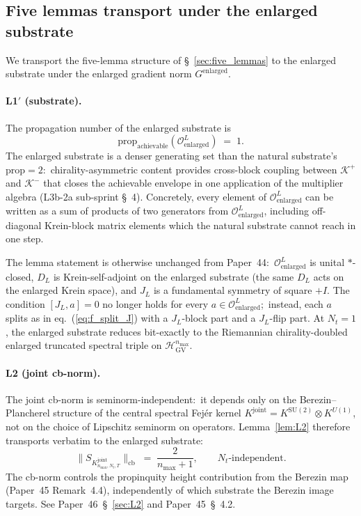 \documentclass[11pt,a4paper]{article}
\theoremstyle{plain}
\theoremstyle{definition}
\newcommand{\nmax}{n_{\max}}
\newcommand{\Nt}{N_{t}}
\newcommand{\Krein}{\mathcal{K}}
\newcommand{\Op}{\mathcal{O}}
\newcommand{\cbnorm}[1]{\lVert #1 \rVert_{\mathrm{cb}}}
\newcommand{\SU}{\mathrm{SU}}
\newcommand{\Uone}{U(1)}
\newcommand{\DL}{D_{L}}
\newcommand{\JL}{J_{L}}
\newcommand{\Kjoint}{K^{\mathrm{joint}}}
\newcommand{\KSU}{K^{\SU(2)}}
\newcommand{\KU}{K^{\Uone}}
\newcommand{\HGV}{\mathcal{H}_{\mathrm{GV}}}
\newcommand{\Kplus}{\Krein^{+}}
\newcommand{\Kminus}{\Krein^{-}}
\newcommand{\prop}{\mathrm{prop}}
\begin{document}
\subsection{Five lemmas transport under the enlarged substrate}
\label{app:enlarged_transport}

We transport the five-lemma structure of \S~\ref{sec:five_lemmas} to
the enlarged substrate under the enlarged gradient norm
$G^{\mathrm{enlarged}}$.

\paragraph{L1$'$ (substrate).}
The propagation number of the enlarged substrate is
\begin{equation}\label{eq:prop_enlarged}
   \prop_{\mathrm{achievable}}(\Op^{L}_{\mathrm{enlarged}}) \;=\; 1.
\end{equation}
The enlarged substrate is a denser generating set than the natural
substrate's $\prop = 2$:\ chirality-asymmetric content provides
cross-block coupling between $\Kplus$ and $\Kminus$ that closes the
achievable envelope in one application of the multiplier algebra
(L3b-2a sub-sprint \S~4). Concretely, every element of $\Op^{L}_{\mathrm{enlarged}}$
can be written as a sum of products of two generators from
$\Op^{L}_{\mathrm{enlarged}}$, including off-diagonal Krein-block
matrix elements which the natural substrate cannot reach in one step.

The lemma statement is otherwise unchanged from Paper~44:\
$\Op^{L}_{\mathrm{enlarged}}$ is unital $\ast$-closed, $\DL$ is
Krein-self-adjoint on the enlarged substrate (the same $\DL$ acts on
the enlarged Krein space), and $\JL$ is a fundamental symmetry of
square $+I$. The condition $[\JL, a] = 0$ no longer holds for every
$a \in \Op^{L}_{\mathrm{enlarged}}$;\ instead, each $a$ splits as in
eq.~(\ref{eq:f_split_J}) with a $\JL$-block part and a $\JL$-flip
part. At $\Nt = 1$, the enlarged substrate reduces bit-exactly to the
Riemannian chirality-doubled enlarged truncated spectral triple on
$\HGV^{\nmax}$.

\paragraph{L2 (joint cb-norm).}
The joint cb-norm is seminorm-independent:\ it depends only on the
Berezin--Plancherel structure of the central spectral Fej\'er kernel
$\Kjoint = \KSU \otimes \KU$, not on the choice of Lipschitz seminorm
on operators. Lemma~\ref{lem:L2} therefore transports verbatim to the
enlarged substrate:
\begin{equation}\label{eq:L2_enlarged}
   \cbnorm{S_{\Kjoint_{\nmax, \Nt, T}}} \;=\; \frac{2}{\nmax + 1},
   \qquad \Nt\text{-independent.}
\end{equation}
The cb-norm controls the propinquity height contribution from the
Berezin map (Paper~45 Remark~4.4), independently of which substrate
the Berezin image targets. See Paper~46~\S~\ref{sec:L2} and
Paper~45~\S~4.2.
\end{document}
